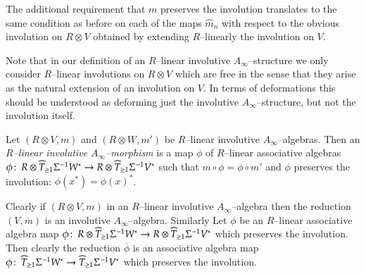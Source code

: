 \documentclass[british]{amsart}
\theoremstyle{plain}
\theoremstyle{definition}
{
\newaliascnt{{definition}}{theorem}\newtheorem{{definition}}[{definition}]{{Definition}}\aliascntresetthe{{definition}}\expandafterautorefname\endcsname{{Definition}}}
{
\newaliascnt{{remark}}{theorem}\newtheorem{{remark}}[{remark}]{{Remark}}\aliascntresetthe{{remark}}\expandafterautorefname\endcsname{{Remark}}}
{
\newaliascnt{{example}}{theorem}\newtheorem{{example}}[{example}]{{Example}}\aliascntresetthe{{example}}\expandafterautorefname\endcsname{{Example}}}
{
\newaliascnt{{examples}}{theorem}\newtheorem{{examples}}[{examples}]{{Examples}}\aliascntresetthe{{examples}}\expandafterautorefname\endcsname{{Examples}}}
{
\newaliascnt{{notation}}{theorem}\newtheorem{{notation}}[{notation}]{{Notation}}\aliascntresetthe{{notation}}\expandafterautorefname\endcsname{{Notation}}}
{
\newaliascnt{{convention}}{theorem}\newtheorem{{convention}}[{convention}]{{Convention}}\aliascntresetthe{{convention}}\expandafterautorefname\endcsname{{Convention}}}
\numberwithin{equation}{section}
\numberwithin{figure}{section}
\begin{document}
The additional requirement that $m$ preserves the involution translates to the same condition as before on each of the maps $\hat{m}_n$ with respect to the obvious involution on $R\otimes V$ obtained by extending $R$--linearly the involution on $V$.

\begin{remark}
Note that in our definition of an $R$--linear involutive $A_\infty$--structure we only consider $R$--linear involutions on $R\otimes V$ which are free in the sense that they arise as the natural extension of an involution on $V$. In terms of deformations this should be understood as deforming just the involutive $A_\infty$--structure, but not the involution itself.
\end{remark}

\begin{definition}
Let $(R\otimes V,m)$ and $(R\otimes W, m')$ be $R$--linear involutive $A_\infty$--algebras. Then an \emph{$R$--linear involutive $A_\infty$--morphism} is a map $\phi$ of $R$--linear associative algebras $\phi{\colon\thinspace} R\otimes \widehat{T}_{\geq 1}\Sigma^{-1}W^*\rightarrow R \otimes \widehat{T}_{\geq 1}\Sigma^{-1}V^*$ such that $m\circ \phi = \phi \circ m'$ and $\phi$ preserves the involution: $\phi(x^*)=\phi(x)^*$.
\end{definition}

Clearly if $(R\otimes V,m)$ in an $R$--linear involutive $A_\infty$--algebra then the reduction $(V,{\overline{{m}}})$ is an involutive $A_\infty$--algebra. Similarly Let $\phi$ be an $R$--linear associative algebra map $\phi{\colon\thinspace} R\otimes \widehat{T}_{\geq 1}\Sigma^{-1}W^*\rightarrow R \otimes \widehat{T}_{\geq 1}\Sigma^{-1}V^*$ which preserves the involution. Then clearly the reduction ${\overline{{\phi}}}$ is an associative algebra map $\phi{\colon\thinspace} \widehat{T}_{\geq 1}\Sigma^{-1}W^*\rightarrow \widehat{T}_{\geq 1}\Sigma^{-1}V^*$ which preserves the involution.
\end{document}

